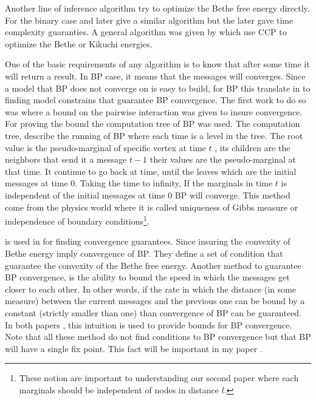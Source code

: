 Another line of inference algorithm try to optimize the Bethe free energy directly.
For the binary case \cite{welling2001belief} and later \cite{shin2012complexity} give a similar algorithm but the later gave time complexity guaranties.
A general algorithm was given by \cite{yuille2002cccp} which use CCP\cite{yuille2002concave} to optimize the Bethe or Kikuchi energies.

One of the basic requirements of any algorithm is to know that after some time it will return a result.
In BP case, it means that the messages will converges.
Since a model that BP does not converge on is easy to build, for BP this translate in to finding model constrains that guarantee BP convergence. 
The first work to do so was \cite{tatikonda2002loopy} where a bound on the pairwise interaction was given to insure convergence.
For proving the bound the computation tree of BP was used.
The computation tree, describe the running of BP where each time is a level in the tree.
The root value is the pseudo-marginal of specific vertex at time $t$ , its children are the neighbors that send it a message $t-1$ their values are the pseudo-marginal at that time.
It continue to go back at time, until the leaves which are the initial messages at time $0$.
Taking the time to infinity, If the marginals in time $t$ is independent of the initial messages at time $0$ BP will converge.
This method come from the physics world where it is called uniqueness of Gibbs measure or independence of boundary conditions\footnote{These notion are important to understanding our second paper \cite{heinemann2014inferning} where each marginals should be independent of nodes in distance $l$.}.

 is used in \cite{heskes2004uniqueness} for finding convergence guarantees.
Since insuring the convexity of Bethe energy imply convergence of BP.
They define a set of condition that guarantee the convexity of the Bethe free energy.
Another method to guarantee BP convergence,  is the ability to bound the speed in which the messages get closer to each other.
In other words, if the rate in which the distance (in some measure) between the current messages and the previous one can be bound by a constant (strictly smaller than one) than convergence of BP can be guaranteed.
In both papers \cite{mooij2007sufficient}, \cite{roosta2008convergence} this intuition is used to provide bounds for BP convergence.
Note that all these method do not find conditions to BP convergence but that BP will have a single fix point.
This fact will be important in my paper \cite{heinemann2012cannot}.

